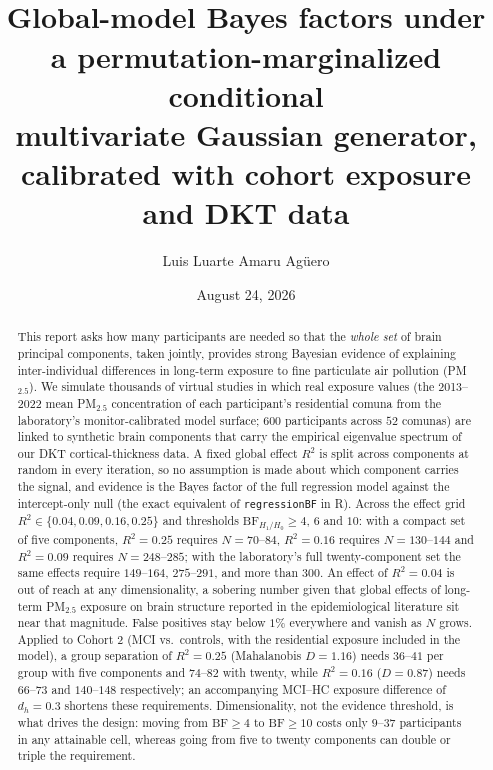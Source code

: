 \documentclass[11pt,a4paper]{article}
\title{\vspace{-1.2em}{\color{NavyInk}\bfseries\LARGE Bayesian Sample Size Determination for\\[2pt]
Residential \pmf{} Exposure and Brain Structure}\\[6pt]
{\large\color{SoftGrey} Global-model Bayes factors under a permutation-marginalized conditional\\ multivariate Gaussian generator, calibrated with cohort \pmf{} exposure and DKT data}}
\author{Luis Luarte \; \textperiodcentered\; Amaru Ag\"uero}
\date{August 24, 2026}
\newcommand{\BF}{\mathrm{BF}}
\newcommand{\pmf}{PM$_{2.5}$}
\begin{document}
\maketitle
\vspace{-1.4em}

\begin{abstract}
\noindent This report asks how many participants are needed so that the \emph{whole set} of brain principal components, taken jointly, provides strong Bayesian evidence of explaining inter-individual differences in long-term exposure to fine particulate air pollution (\pmf). We simulate thousands of virtual studies in which real exposure values (the 2013--2022 mean \pmf{} concentration of each participant's residential comuna from the laboratory's monitor-calibrated model surface; $600$ participants across $52$ comunas) are linked to synthetic brain components that carry the empirical eigenvalue spectrum of our DKT cortical-thickness data. A fixed global effect $R^{2}$ is split across components at random in every iteration, so no assumption is made about which component carries the signal, and evidence is the Bayes factor of the full regression model against the intercept-only null (the exact equivalent of \texttt{regressionBF} in R). Across the effect grid $R^{2}\in\{0.04,0.09,0.16,0.25\}$ and thresholds $\BF_{H_1/H_0}\ge4$, $6$ and $10$: with a compact set of five components, $R^{2}=0.25$ requires $N=70$--$84$, $R^{2}=0.16$ requires $N=130$--$144$ and $R^{2}=0.09$ requires $N=248$--$285$; with the laboratory's full twenty-component set the same effects require $149$--$164$, $275$--$291$, and more than $300$. An effect of $R^{2}=0.04$ is out of reach at any dimensionality, a sobering number given that global effects of long-term \pmf{} exposure on brain structure reported in the epidemiological literature sit near that magnitude. False positives stay below $1\%$ everywhere and vanish as $N$ grows. Applied to Cohort 2 (MCI vs.\ controls, with the residential exposure included in the model), a group separation of $R^{2}=0.25$ (Mahalanobis $D=1.16$) needs $36$--$41$ per group with five components and $74$--$82$ with twenty, while $R^{2}=0.16$ ($D=0.87$) needs $66$--$73$ and $140$--$148$ respectively; an accompanying MCI--HC exposure difference of $d_h=0.3$ shortens these requirements. Dimensionality, not the evidence threshold, is what drives the design: moving from $\BF\ge4$ to $\BF\ge10$ costs only $9$--$37$ participants in any attainable cell, whereas going from five to twenty components can double or triple the requirement.
\end{abstract}
\end{document}
